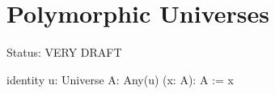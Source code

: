 \section{Polymorphic Universes}


\noindent Status: VERY DRAFT


\begin{alba}
    identity
        {u: Universe} {A: Any(u)}
        (x: A): A
    :=
        x
\end{alba}

